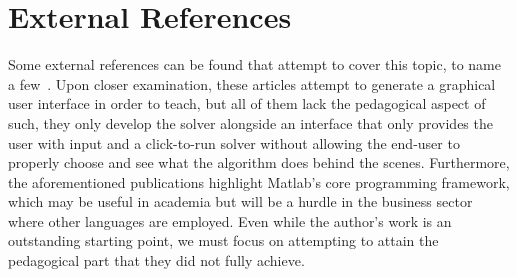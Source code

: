 \section{External References}
Some external references can be found that attempt to cover this topic, to name a few~\cite{BUldingMatlabGUI,vonDohlen2020,Kosasih,kosasih2007incorporating,welfert1996applied}. Upon closer examination, these articles attempt to generate a graphical user interface in order to teach, but all of them lack the pedagogical aspect of such, they only develop the solver alongside an interface that only provides the user with input and a click-to-run solver without allowing the end-user to properly choose and see what the algorithm does behind the scenes. Furthermore, the aforementioned publications highlight Matlab's core programming framework, which may be useful in academia but will be a hurdle in the business sector where other languages are employed. Even while the author's work is an outstanding starting point, we must focus on attempting to attain the pedagogical part that they did not fully achieve.